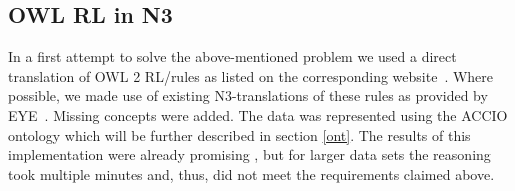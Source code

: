 %  

\subsection{OWL RL in N3}\label{owlrl}

 

In a first attempt to solve the above-mentioned problem we used a direct translation of OWL 2 RL/\rdf rules as listed on the corresponding website~\cite{OWLRL}. 
Where possible, we made use of existing N3-translations of these rules as provided by EYE~\cite{EYEowl}. Missing concepts were added. 
The data was represented using the ACCIO ontology \cite{accioont} which will be further described in section \ref{ont}.
The results of this 
implementation were already promising \cite{arndt_ruleml_2015}, but for larger data sets the reasoning took multiple minutes and, thus, did not meet the requirements claimed above. 

